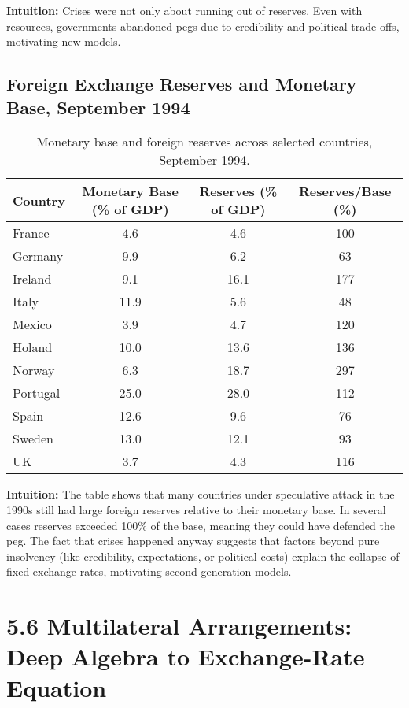 \documentclass[12pt]{article}
\begin{document}
\textbf{Intuition:} Crises were not only about running out of reserves. Even with resources, governments abandoned pegs due to credibility and political trade-offs, motivating new models.

\subsection*{Foreign Exchange Reserves and Monetary Base, September 1994}

\begin{table}[H]
\centering
\begin{tabular}{lccc}
\hline
Country & Monetary Base (\% of GDP) & Reserves (\% of GDP) & Reserves/Base (\%) \\
\hline
France   & 4.6  & 4.6  & 100 \\
Germany  & 9.9  & 6.2  & 63  \\
Ireland  & 9.1  & 16.1 & 177 \\
Italy    & 11.9 & 5.6  & 48  \\
Mexico   & 3.9  & 4.7  & 120 \\
Holand   & 10.0 & 13.6 & 136 \\
Norway   & 6.3  & 18.7 & 297 \\
Portugal & 25.0 & 28.0 & 112 \\
Spain    & 12.6 & 9.6  & 76  \\
Sweden   & 13.0 & 12.1 & 93  \\
UK       & 3.7  & 4.3  & 116 \\
\hline
\end{tabular}
\caption{Monetary base and foreign reserves across selected countries, September 1994.}
\end{table}

\textbf{Intuition:}  
The table shows that many countries under speculative attack in the 1990s still had large foreign reserves relative to their monetary base. In several cases reserves exceeded 100\% of the base, meaning they could have defended the peg. The fact that crises happened anyway suggests that factors beyond pure insolvency (like credibility, expectations, or political costs) explain the collapse of fixed exchange rates, motivating second-generation models.

\section*{5.6 Multilateral Arrangements: Deep Algebra to Exchange-Rate Equation}
\end{document}
